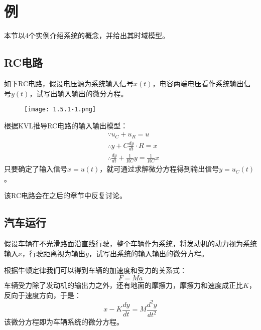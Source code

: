 \section{例}

本节以4个实例介绍系统的概念，并给出其时域模型。

\subsection{RC电路}

\begin{example}
如下RC电路，假设电压源为系统输入信号$x\left( t \right) $，电容两端电压看作系统输出信号$y\left( t \right) $，试写出输入输出的微分方程。
\end{example}

\begin{figure}[h]
\centering
\texttt{[image: 1.5.1-1.png]}
\end{figure}

根据KVL推导RC电路的输入输出模型：
\begin{align*}
&\because u_C+u_R=u \\
&\therefore y+C\frac{dy}{dt}\cdot R=x \\
&\therefore \frac{dy}{dt}+\frac{1}{RC}y=\frac{1}{RC}x
\end{align*}
只要确定了输入信号$x=u\left( t \right) $，就可通过求解微分方程得到输出信号$y=u_C\left( t \right) $。

\begin{tcolorbox}
该RC电路会在之后的章节中反复讨论。
\end{tcolorbox}

\subsection{汽车运行}

\begin{example}
假设车辆在不光滑路面沿直线行驶，整个车辆作为系统，将发动机的动力视为系统输入$x$，行驶距离视为输出$y$，试写出系统的输入输出的微分方程。
\end{example}

根据牛顿定律我们可以得到车辆的加速度和受力的关系式：
\[
F=Ma
\]
车辆受力除了发动机的输出力之外，还有地面的摩擦力，摩擦力和速度成正比$K$，反向于速度方向，于是：
\[
x-K\frac{dy}{dt}=M\frac{d^2y}{dt^2}
\]
该微分方程即为车辆系统的微分方程。

